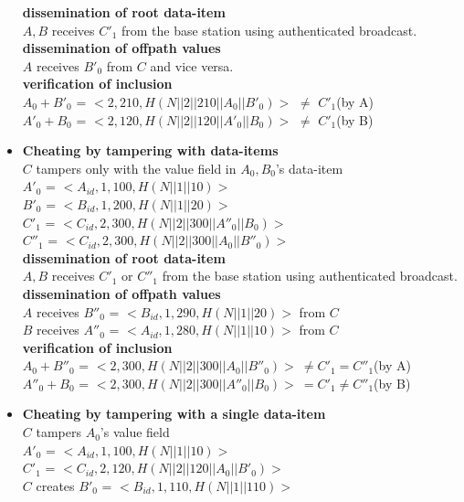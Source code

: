 \begin{exmp}
\begin{itemize}
		\textbf{dissemination of root data-item}\\
			$A,B$ receives $C'_{1}$ from the base station using authenticated broadcast.\\
		\textbf{dissemination of offpath values}\\
			$A$ receives $B'_{0}$ from $C$ and vice versa.\\
		\textbf{verification of inclusion}\\
			$A_{0}+B'_{0}$ = $<2,210,H(N||2||210||A_{0}||B'_{0})>$ $\neq$ $C'_{1}$(by A)\\
			$A'_{0}+B_{0}$ = $<2,120,H(N||2||120||A'_{0}||B_{0})>$ $\neq$ $C'_{1}$(by B)
	\item \textbf{Cheating by tampering with data-items}\\
		$C$ tampers only with the value field in $A_{0},B_{0}$'s data-item\\
		$A'_{0}$ = $<A_{id},1,100, H(N||1||10)>$\\
		$B'_{0}$ = $<B_{id},1,200, H(N||1||20)>$\\
		$C'_{1}$ = $<C_{id},2,300, H(N||2||300||A''_{0}||B_{0})>$\\
		$C''_{1}$ = $<C_{id},2,300, H(N||2||300||A_{0}||B''_{0})>$\\
		\textbf{dissemination of root data-item}\\
		$A,B$ receives $C'_{1}$ or $C''_{1}$ from the base station using authenticated broadcast.\\
		\textbf{dissemination of offpath values}\\
		$A$ receives $B''_{0}$ = $<B_{id},1,290,H(N||1||20)>$ from $C$\\
		$B$ receives $A''_{0}$ = $<A_{id},1,280,H(N||1||10)>$ from $C$\\
		\textbf{verification of inclusion}\\
		$A_{0}+B''_{0}$ = $<2,300,H(N||2||300||A_{0}||B''_{0})>\  \neq C'_{1} = C''_{1}$(by A)\\
		$A''_{0}+B_{0}$ = $<2,300,H(N||2||300||A''_{0}||B_{0})>\  = C'_{1} \neq C''_{1}$(by B)
	\item \textbf{Cheating by tampering with a single data-item}\\
		$C$ tampers $A_{0}$'s value field\\
		$A'_{0}$ = $<A_{id},1,100, H(N||1||10)>$\\
		$C'_{1}$ = $<C_{id},2,120, H(N||2||120||A_{0}||B'_{0})>$\\
		$C$ creates $B'_{0}$ = $<B_{id},1,110, H(N||1||110)>$\\

\end{itemize}
\end{exmp}
